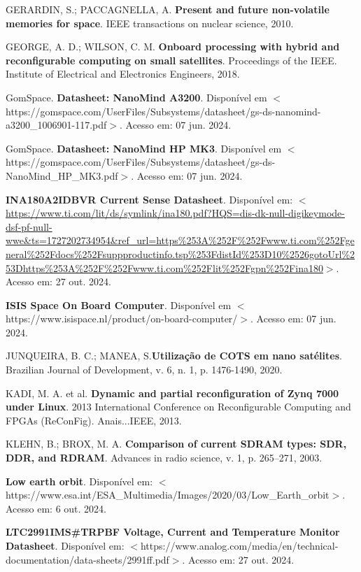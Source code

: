 \begin{flushleft}
\begin{thebibliography}{00}
 GERARDIN, S.; PACCAGNELLA, A. \textbf{Present and future non-volatile memories for space}. IEEE transactions on nuclear science, 2010.

 GEORGE, A. D.; WILSON, C. M. \textbf{Onboard processing with hybrid and reconfigurable computing on small satellites}. Proceedings of the IEEE. Institute of Electrical and Electronics Engineers, 2018.

 GomSpace. \textbf{Datasheet: NanoMind A3200}. Disponível em $<$https://gomspace.com/UserFiles/Subsystems/datasheet/gs-ds-nanomind-a3200\_1006901-117.pdf$>$. Acesso em: 07 jun. 2024.

 GomSpace. \textbf{Datasheet: NanoMind HP MK3}. Disponível em $<$https://gomspace.com/UserFiles/Subsystems/datasheet/gs-ds-NanoMind\_HP\_MK3.pdf$>$. Acesso em: 07 jun. 2024.

 \textbf{INA180A2IDBVR Current Sense Datasheet}. Disponível em: $<$\url{https://www.ti.com/lit/ds/symlink/ina180.pdf?HQS=dis-dk-null-digikeymode-dsf-pf-null-wwe\&ts=1727202734954\&ref\_url=https\%253A\%252F\%252Fwww.ti.com\%252Fgeneral\%252Fdocs\%252Fsuppproductinfo.tsp\%253FdistId\%253D10\%2526gotoUrl\%253Dhttps\%253A\%252F\%252Fwww.ti.com\%252Flit\%252Fgpn\%252Fina180}$>$. Acesso em: 27 out. 2024. 

 \textbf{ISIS Space On Board Computer}. Disponível em $<$https://www.isispace.nl/product/on-board-computer/$>$. Acesso em: 07 jun. 2024.

 JUNQUEIRA, B. C.; MANEA, S.\textbf{Utilização de COTS em nano satélites}. Brazilian Journal of Development, v. 6, n. 1, p. 1476-1490, 2020.

 KADI, M. A. et al. \textbf{Dynamic and partial reconfiguration of Zynq 7000 under Linux}. 2013 International Conference on Reconfigurable Computing and FPGAs (ReConFig). Anais...IEEE, 2013.

 KLEHN, B.; BROX, M. A. \textbf{Comparison of current SDRAM types: SDR, DDR, and RDRAM}. Advances in radio science, v. 1, p. 265–271, 2003.

 \textbf{Low earth orbit}. Disponível em: $<$https://www.esa.int/ESA\_Multimedia/Images/2020/03/Low\_Earth\_orbit$>$. Acesso em: 6 out. 2024.

 \textbf{LTC2991IMS\#TRPBF Voltage, Current and Temperature Monitor Datasheet}. Disponível em: $<$https://www.analog.com/media/en/technical-documentation/data-sheets/2991ff.pdf$>$. Acesso em: 27 out. 2024. 


\end{thebibliography}
\end{flushleft}
